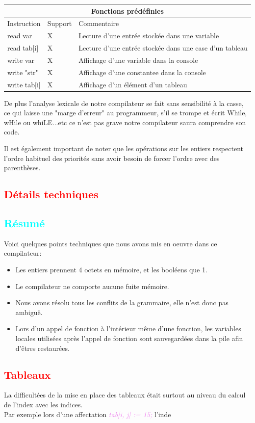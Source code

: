 \documentclass[a4paper]{article}
\let\oldtextit\textit
\renewcommand{\textit}[1]{\textcolor{violet}{\oldtextit{#1}}}
\newcommand{\csection}[1]{\textcolor{red}{\section{#1}}}
\newcommand{\csubsection}[1]{\textcolor{cyan}{\subsection{#1}}}
\begin{document}
\begin{center}
\begin{tabular}{|l|l|l|}
  \hline
  \multicolumn{3}{|c|}{Fonctions prédéfinies} \\
  \hline
  Instruction & Support & Commentaire \\
  \hline
  read var & X & Lecture d'une entrée stockée dans une variable \\
  read tab$[$i$]$ & X & Lecture d'une entrée stockée dans une case d'un tableau \\
  write var & X & Affichage d'une variable dans la console \\
  write "str" & X & Affichage d'une constantee dans la console \\
  write tab$[$i$]$ & X & Affichage d'un élément d'un tableau \\
  \hline
\end{tabular}

\end{center}

De plus l'analyse lexicale de notre compilateur se fait sans sensibilité à la casse, ce qui laisse une "marge d'erreur" au programmeur, s'il se trompe et écrit While, wHile ou whiLE...etc ce n'est pas grave notre compilateur saura comprendre son code.

Il est également important de noter que les opérations sur les entiers respectent l'ordre habituel des priorités sans avoir besoin de forcer l'ordre avec des parenthèses.

\csection{Détails techniques}

\csubsection{Résumé}

Voici quelques points techniques que nous avons mis en oeuvre dans ce compilateur:
\begin{itemize}
    \item Les entiers prennent 4 octets en mémoire, et les booléens que 1.
    \item Le compilateur ne comporte aucune fuite mémoire.
    \item Nous avons résolu tous les conflits de la grammaire, elle n'est donc pas ambiguë.
    \item Lors d'un appel de fonction à l'intérieur même d'une fonction, les variables locales utilisées après l'appel de fonction sont sauvegardées dans la pile afin d'êtres restaurées.
\end{itemize}

\csection{Tableaux}

La difficultées de la mise en place des tableaux était surtout au niveau du calcul de l'index avec les indices.\\
Par exemple lors d'une affectation \textit{tab[i, j] := 15;} l'inde
\end{document}
